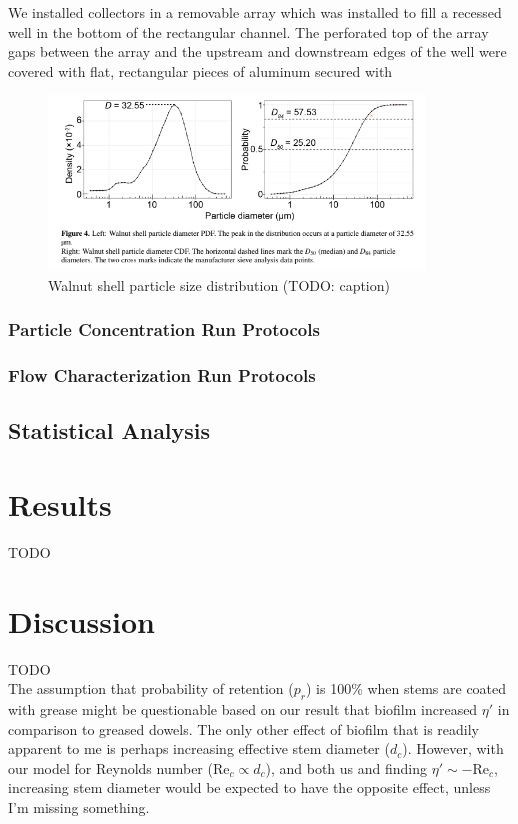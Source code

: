 \documentclass[10pt,a4paper]{article}
\newcommand\Rey{\mathrm{Re}}
\begin{document}
We installed collectors in a removable array which was installed to fill a recessed well in the bottom of the rectangular channel. The perforated top of the array gaps between the array and the upstream and downstream edges of the well were covered with flat, rectangular pieces of aluminum secured with 

\begin{figure}[h]
\includegraphics[width=10cm]{wf5-200sizedist.png}
\centering
\caption{Walnut shell particle size distribution (TODO: caption)}
\end{figure}

\subsubsection{Particle Concentration Run Protocols}

\subsubsection{Flow Characterization Run Protocols}

\subsection{Statistical Analysis}

\section{Results}

TODO

\section{Discussion}

TODO\\
\hfill\break
The assumption that probability of retention (\(p_r\)) is 100\% when stems are coated with grease might be questionable based on our result that biofilm increased \(\eta\prime\) in comparison to greased dowels. The only other effect of biofilm that is readily apparent to me is perhaps increasing effective stem diameter (\(d_c\)). However, with our model for Reynolds number (\(\Rey_c \propto d_c\)), and both us and \citet{Fauria_2015} finding \(\eta\prime \sim -\Rey_c\), increasing stem diameter would be expected to have the opposite effect, unless I'm missing something.



\end{document}

